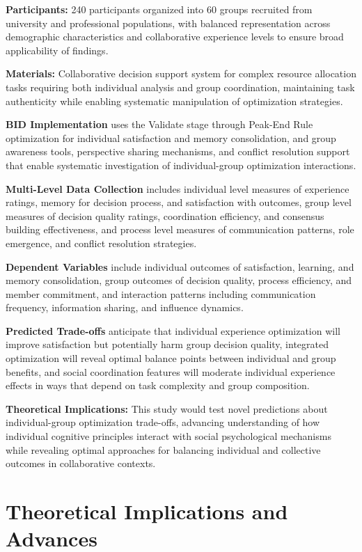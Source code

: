 \documentclass[
  authoryear,
  preprint]{elsarticle}
\begin{document}
\textbf{Participants:} 240 participants organized into 60 groups
recruited from university and professional populations, with balanced
representation across demographic characteristics and collaborative
experience levels to ensure broad applicability of findings.

\textbf{Materials:} Collaborative decision support system for complex
resource allocation tasks requiring both individual analysis and group
coordination, maintaining task authenticity while enabling systematic
manipulation of optimization strategies.

\textbf{BID Implementation} uses the Validate stage through Peak-End
Rule optimization for individual satisfaction and memory consolidation,
and group awareness tools, perspective sharing mechanisms, and conflict
resolution support that enable systematic investigation of
individual-group optimization interactions.

\textbf{Multi-Level Data Collection} includes individual level measures
of experience ratings, memory for decision process, and satisfaction
with outcomes, group level measures of decision quality ratings,
coordination efficiency, and consensus building effectiveness, and
process level measures of communication patterns, role emergence, and
conflict resolution strategies.

\textbf{Dependent Variables} include individual outcomes of
satisfaction, learning, and memory consolidation, group outcomes of
decision quality, process efficiency, and member commitment, and
interaction patterns including communication frequency, information
sharing, and influence dynamics.

\textbf{Predicted Trade-offs} anticipate that individual experience
optimization will improve satisfaction but potentially harm group
decision quality, integrated optimization will reveal optimal balance
points between individual and group benefits, and social coordination
features will moderate individual experience effects in ways that depend
on task complexity and group composition.

\textbf{Theoretical Implications:} This study would test novel
predictions about individual-group optimization trade-offs, advancing
understanding of how individual cognitive principles interact with
social psychological mechanisms while revealing optimal approaches for
balancing individual and collective outcomes in collaborative contexts.

\section{Theoretical Implications and
Advances}\label{theoretical-implications-and-advances}
\end{document}
